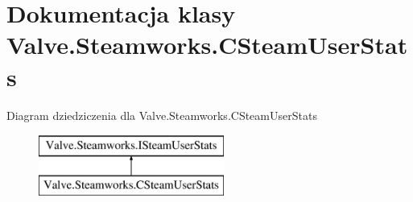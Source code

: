 \hypertarget{class_valve_1_1_steamworks_1_1_c_steam_user_stats}{}\section{Dokumentacja klasy Valve.\+Steamworks.\+C\+Steam\+User\+Stats}
\label{class_valve_1_1_steamworks_1_1_c_steam_user_stats}
Diagram dziedziczenia dla Valve.\+Steamworks.\+C\+Steam\+User\+Stats\begin{figure}[H]
\begin{center}
\leavevmode
\includegraphics[height=2.000000cm]{class_valve_1_1_steamworks_1_1_c_steam_user_stats}
\end{center}
\end{figure}
